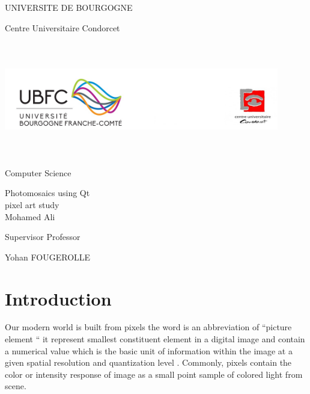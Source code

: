 \documentclass[a4paper,12pt]{report}
\begin{document}
	
	\begin{titlepage}
		\vspace*{0.5cm}
		{\centering UNIVERSITE DE BOURGOGNE
			
			
		  		  	Centre Universitaire Condorcet \par}
	  		  	\includegraphics[width=12cm, height=5cm,
	  		  	keepaspectratio]{logo2.jpg}
		
	
		\noindent\hrulefill\par
		\vspace*{2cm} 
		
		{\LARGE Computer Science  \\
			 \par}
		 \vspace*{2cm} 
		 
		 {\LARGE \centering  Photomosaics using Qt \\
		 	pixel art study\\
		 \vspace*{0.5cm} Mohamed Ali \par }
		 
		 
		\vfill
	{\large\raggedleft Supervisor   Professor\par}
	
		{\Large\raggedleft  Yohan FOUGEROLLE\par}
	\end{titlepage}
	
	
	
	\tableofcontents
	
	\chapter{Introduction}
	Our modern world is built from pixels the word is an abbreviation of “picture element “ it represent smallest constituent element in a digital image and contain a numerical value  which is the basic unit of information within the image at a given spatial resolution and quantization level . Commonly, pixels contain the color or intensity response of image as a small point sample of colored light from scene.\\
	
\end{document}
